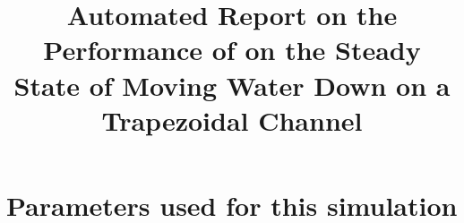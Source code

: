 \documentclass[11pt,a4paper]{article}%
\begin{document}
 

\title{Automated Report on the Performance of \anuga{} on the Steady State of Moving Water Down on a Trapezoidal Channel}
\maketitle




\section{Parameters used for this simulation}






\end{document}
